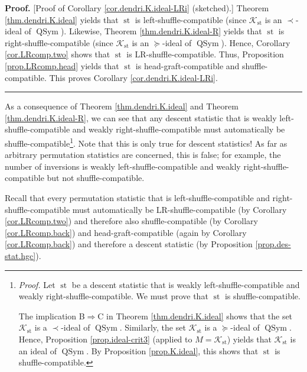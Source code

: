 \documentclass[numbers=enddot,12pt,final,onecolumn,notitlepage]{scrartcl}%
\theoremstyle{definition}
\newenvironment{proof}[1][Proof]{\noindent\textbf{#1.} }{\ \rule{0.5em}{0.5em}}
\newenvironment{verlong}{}{}
\begin{document}
\begin{verlong}
\begin{proof}
[Proof of Corollary \ref{cor.dendri.K.ideal-LRi} (sketched).] Theorem
\ref{thm.dendri.K.ideal} yields that $\operatorname{st}$ is
left-shuffle-compatible (since $\mathcal{K}_{\operatorname{st}}$ is an
$\left.  \prec\right.  $-ideal of $\operatorname*{QSym}$). Likewise, Theorem
\ref{thm.dendri.K.ideal-R} yields that $\operatorname{st}$ is
right-shuffle-compatible (since $\mathcal{K}_{\operatorname{st}}$ is an
$\left.  \succeq\right.  $-ideal of $\operatorname*{QSym}$). Hence, Corollary
\ref{cor.LRcomp.two} shows that $\operatorname{st}$ is LR-shuffle-compatible.
Thus, Proposition \ref{prop.LRcomp.head} yields that $\operatorname{st}$ is
head-graft-compatible and shuffle-compatible. This proves Corollary
\ref{cor.dendri.K.ideal-LRi}.
\end{proof}

As a consequence of Theorem \ref{thm.dendri.K.ideal} and Theorem
\ref{thm.dendri.K.ideal-R}, we can see that any descent statistic that is
weakly left-shuffle-compatible and weakly right-shuffle-compatible must
automatically be shuffle-compatible\footnote{\textit{Proof.} Let
$\operatorname{st}$ be a descent statistic that is weakly
left-shuffle-compatible and weakly right-shuffle-compatible. We must prove
that $\operatorname{st}$ is shuffle-compatible.
\par
The implication B$\Longrightarrow$C in Theorem \ref{thm.dendri.K.ideal} shows
that the set $\mathcal{K}_{\operatorname{st}}$ is a $\left.  \prec\right.
$-ideal of $\operatorname*{QSym}$. Similarly, the set $\mathcal{K}%
_{\operatorname{st}}$ is a $\left.  \succeq\right.  $-ideal of
$\operatorname*{QSym}$. Hence, Proposition \ref{prop.ideal-crit3} (applied to
$M=\mathcal{K}_{\operatorname{st}}$) yields that $\mathcal{K}%
_{\operatorname{st}}$ is an ideal of $\operatorname*{QSym}$. By Proposition
\ref{prop.K.ideal}, this shows that $\operatorname{st}$ is
shuffle-compatible.}. Note that this is only true for descent statistics! As
far as arbitrary permutation statistics are concerned, this is false; for
example, the number of inversions is weakly left-shuffle-compatible and weakly
right-shuffle-compatible but not shuffle-compatible.

Recall that every permutation statistic that is left-shuffle-compatible and
right-shuffle-compatible must automatically be LR-shuffle-compatible (by
Corollary \ref{cor.LRcomp.two}) and therefore also shuffle-compatible (by
Corollary \ref{cor.LRcomp.back}) and head-graft-compatible (again by Corollary
\ref{cor.LRcomp.back}) and therefore a descent statistic (by Proposition
\ref{prop.des-stat.hgc}).


\end{verlong}
\end{document}
